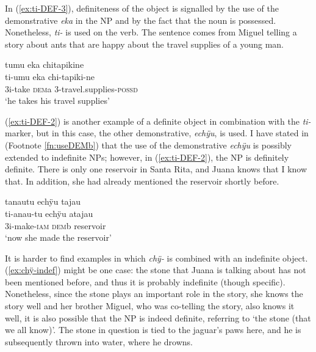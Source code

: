 In (\ref{ex:ti-DEF-3}), definiteness of the object is signalled by the use of the demonstrative \textit{eka} in the NP and by the fact that the noun is possessed. Nonetheless, \textit{ti-} is used on the verb. The sentence comes from Miguel telling a story about ants that are happy about the travel supplies of a young man.

\ea\label{ex:ti-DEF-3}
\begingl
\glpreamble tumu eka chitapikine\\
\gla ti-umu eka chi-tapiki-ne\\
\glb 3i-take \textsc{dem}a 3-travel.supplies-\textsc{possd}\\
\glft ‘he takes his travel supplies’
\endgl
{}
\xe


(\ref{ex:ti-DEF-2}) is another example of a definite object in combination with the \textit{ti-} marker, but in this case, the other demonstrative, \textit{echÿu}, is used. I have stated in  (Footnote \ref{fn:useDEMb}) that the use of the demonstrative \textit{echÿu} is possibly extended to indefinite NPs; however, in (\ref{ex:ti-DEF-2}), the NP is definitely definite. There is only one reservoir in Santa Rita, and Juana knows that I know that. In addition, she had already mentioned the reservoir shortly before.

\ea\label{ex:ti-DEF-2}
\begingl 
\glpreamble tanautu echÿu tajau\\
\gla ti-anau-tu echÿu atajau\\ 
\glb 3i-make-\textsc{iam} \textsc{dem}b reservoir\\ 
\glft ‘now she made the reservoir’\\ 
\endgl
\trailingcitation{[jxx-p120515l-2.083]}
\xe

It is harder to find examples in which \textit{chÿ-} is combined with an indefinite object. (\ref{ex:chÿ-indef}) might be one case: the stone that Juana is talking about has not been mentioned before, and thus it is probably indefinite (though specific). Nonetheless, since the stone plays an important role in the story, she knows the story well and her brother Miguel, who was co-telling the story, also knows it well, it is also possible that the NP is indeed definite, referring to ‘the stone (that we all know)’. The stone in question is tied to the jaguar’s paws here, and he is subsequently thrown into water, where he drowns.

